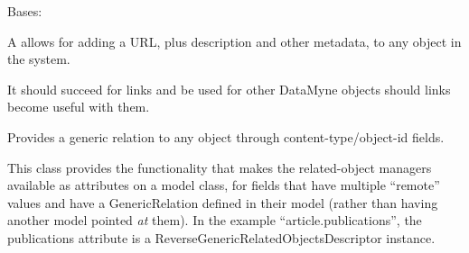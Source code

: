 \documentclass[letterpaper,10pt,english]{sphinxmanual}
\begin{document}

\begin{fulllineitems}
\label{generated/apps.profiles.models:apps.profiles.models.Link}
Bases: {\hyperref[generated/apps.profiles.models:apps.profiles.models.BaseModel]{}}

A  allows for adding a URL, plus description and other metadata,
to any object in the system.

It should succeed  for  links and be used for other
DataMyne objects should links become useful with them.


\begin{fulllineitems}
\label{generated/apps.profiles.models:apps.profiles.models.Link.content_object}
Provides a generic relation to any object through content-type/object-id
fields.

\end{fulllineitems}



\begin{fulllineitems}
\label{generated/apps.profiles.models:apps.profiles.models.Link.unit_permissions}
This class provides the functionality that makes the related-object
managers available as attributes on a model class, for fields that have
multiple ``remote'' values and have a GenericRelation defined in their model
(rather than having another model pointed \emph{at} them). In the example
``article.publications'', the publications attribute is a
ReverseGenericRelatedObjectsDescriptor instance.

\end{fulllineitems}


\end{fulllineitems}


\end{document}

